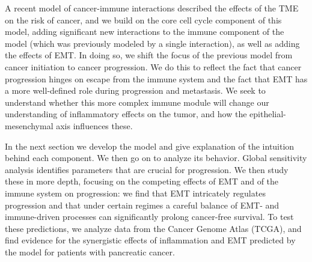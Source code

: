\documentclass[11pt]{article}
\begin{document}
A recent model of cancer-immune interactions \cite{guo17_multiscale} described the effects of the TME on the risk of cancer, and we build on the core cell cycle component of this model, adding significant new interactions to the immune component of the model (which was previously modeled by a single interaction), as well as adding the effects of EMT.
In doing so, we shift the focus of the previous model from cancer initiation to cancer progression.
We do this to reflect the fact that cancer progression hinges on escape from the immune system and the fact that EMT has a more well-defined role during progression and metastasis.
We seek to understand whether this more complex immune module will change our understanding of inflammatory effects on the tumor, and how the epithelial-mesenchymal axis influences these.
\par 
In the next section we develop the model and give explanation of the intuition behind each component.
We then go on to analyze its behavior.
Global sensitivity analysis identifies parameters that are crucial for progression.
We then study these in more depth, focusing on the competing effects of EMT and of the immune system on progression: we find that EMT intricately regulates progression and that under certain regimes a careful balance of EMT- and immune-driven processes can significantly prolong cancer-free survival.
To test these predictions, we analyze data from the Cancer Genome Atlas (TCGA), and find evidence for the synergistic effects of inflammation and EMT predicted by the model for patients with pancreatic cancer.
\end{document}

